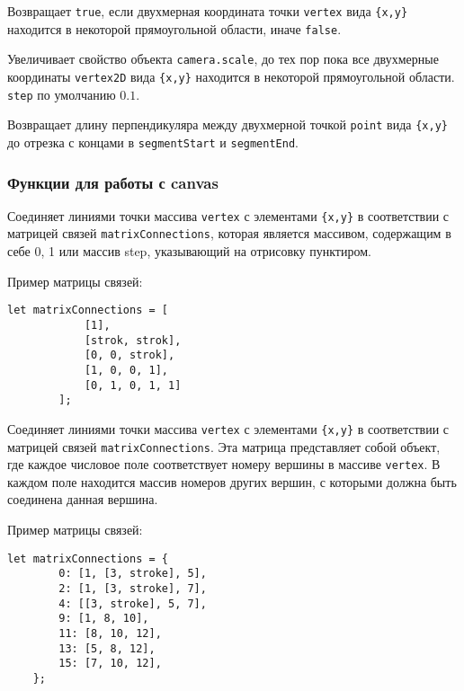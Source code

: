 Возвращает \texttt{true}, если двухмерная координата точки \texttt{vertex} вида \texttt{\{x,y\}} находится в некоторой прямоугольной области, иначе \texttt{false}.

Увеличивает свойство объекта \texttt{camera.scale}, до тех пор пока все двухмерные координаты \texttt{vertex2D} вида \texttt{\{x,y\}}  находится в некоторой прямоугольной области. \texttt{step} по умолчанию $0.1$.

Возвращает длину перпендикуляра между двухмерной точкой \texttt{point} вида \texttt{\{x,y\}} до отрезка с концами в \texttt{segmentStart} и \texttt{segmentEnd}.

\subsubsection{Функции для работы с canvas}

Соединяет линиями точки массива \texttt{vertex} с элементами \texttt{\{x,y\}} в соответствии с матрицей связей \texttt{matrixConnections}, которая является массивом, содержащим в себе 0, 1 или массив step, указывающий на отрисовку пунктиром.

Пример матрицы связей:
\begin{lstlisting}[frame=none]
	let matrixConnections = [
			[1],
			[strok, strok],
			[0, 0, strok],
			[1, 0, 0, 1],
			[0, 1, 0, 1, 1]
		];
	\end{lstlisting}

Соединяет линиями точки массива \texttt{vertex} с элементами \texttt{\{x,y\}} в соответствии с матрицей связей \texttt{matrixConnections}. Эта матрица представляет собой объект, где каждое числовое поле соответствует номеру вершины в массиве \texttt{vertex}. В каждом поле находится массив номеров других вершин, с которыми должна быть соединена данная вершина.

Пример матрицы связей:
\begin{lstlisting}[frame=none]
	let matrixConnections = {
		0: [1, [3, stroke], 5],
		2: [1, [3, stroke], 7],
		4: [[3, stroke], 5, 7],
		9: [1, 8, 10],
		11: [8, 10, 12],
		13: [5, 8, 12],
		15: [7, 10, 12],
	};
	\end{lstlisting}


